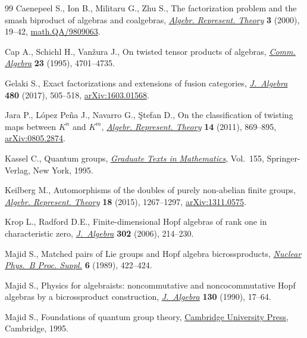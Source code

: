 \documentclass[pdftex]{sigma}
\numberwithin{equation}{section}
\begin{document}
\begin{thebibliography}{99}
Caenepeel S., Ion B., Militaru G., Zhu S., The factorization problem and the
 smash biproduct of algebras and coalgebras, \href{https://doi.org/10.1023/A:1009917210863}{\textit{Algebr. Represent.
 Theory}} \textbf{3} (2000), 19--42, \href{https://arxiv.org/abs/math.QA/9809063}{math.QA/9809063}.

Cap A., Schichl H., Van\v{z}ura J., On twisted tensor products of algebras,
 \href{https://doi.org/10.1080/00927879508825496}{\textit{Comm. Algebra}} \textbf{23} (1995), 4701--4735.

Gelaki S., Exact factorizations and extensions of fusion categories,
 \href{https://doi.org/10.1016/j.jalgebra.2017.02.034}{\textit{J.~Algebra}} \textbf{480} (2017), 505--518, \href{https://arxiv.org/abs/1603.01568}{arXiv:1603.01568}.

Jara P., L\'opez Pe\~na J., Navarro G., \c{S}tefan D., On the classification of
 twisting maps between {$K^n$} and {$K^m$}, \href{https://doi.org/10.1007/s10468-010-9222-x}{\textit{Algebr. Represent. Theory}}
 \textbf{14} (2011), 869--895, \href{https://arxiv.org/abs/0805.2874}{arXiv:0805.2874}.

Kassel C., Quantum groups, \href{https://doi.org/10.1007/978-1-4612-0783-2}{\textit{Graduate Texts in Mathematics}}, Vol.~155,
 Springer-Verlag, New York, 1995.

Keilberg M., Automorphisms of the doubles of purely non-abelian finite groups,
 \href{https://doi.org/10.1007/s10468-015-9540-0}{\textit{Algebr. Represent. Theory}} \textbf{18} (2015), 1267--1297,
 \href{https://arxiv.org/abs/1311.0575}{arXiv:1311.0575}.

Krop L., Radford D.E., Finite-dimensional {H}opf algebras of rank one in
 characteristic zero, \href{https://doi.org/10.1016/j.jalgebra.2006.03.031}{\textit{J.~Algebra}} \textbf{302} (2006), 214--230.

Majid S., Matched pairs of {L}ie groups and {H}opf algebra bicrossproducts,
 \href{https://doi.org/10.1016/0920-5632(89)90488-X}{\textit{Nuclear Phys.~B Proc. Suppl.}} \textbf{6} (1989), 422--424.

Majid S., Physics for algebraists: noncommutative and noncocommutative {H}opf
 algebras by a bicrossproduct construction, \href{https://doi.org/10.1016/0021-8693(90)90099-A}{\textit{J.~Algebra}} \textbf{130}
 (1990), 17--64.

Majid S., Foundations of quantum group theory, \href{https://doi.org/10.1017/CBO9780511613104}{Cambridge University Press},
 Cambridge, 1995.


\end{thebibliography}
\end{document}
